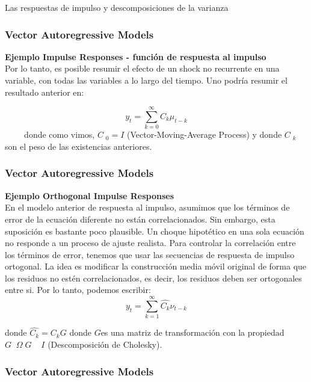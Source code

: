 \documentclass[spanish,xcolor=table]{beamer}
\begin{document}
\begin{section}{Las respuestas de impulso y descomposiciones de la varianza}
\begin{frame}
\end{frame}
\begin{frame}
\frametitle{Vector Autoregressive Models}

\textbf{Ejemplo Impulse Responses - funci\'on de respuesta al impulso}\\
Por lo tanto, es posible resumir el efecto de un shock no recurrente en una variable, con todas las variables a lo largo del tiempo. Uno podr\'{i}a resumir el resultado anterior en:

\begin{equation*}
y_t = \sum_{k=0}^{\infty}  C_k \mu_{t-k}
\end{equation*}
􏰂􏰃􏰟􏰟􏰂􏰄􏰟
donde como vimos, $C􏰝_0= I$ (Vector-Moving-Average Process) y donde $C􏰟_k$ son el peso de las existencias anteriores.

\end{frame}
\begin{frame}
\frametitle{Vector Autoregressive Models}

\textbf{Ejemplo Orthogonal Impulse Responses}\\

En el modelo anterior de respuesta al impulso, asumimos que los t\'erminos de error de la ecuaci\'on diferente no est\'an correlacionados. Sin embargo, esta suposici\'on es bastante poco plausible. Un choque hipot\'etico en una sola ecuaci\'on no responde a un proceso de ajuste realista. Para controlar la correlaci\'on entre los t\'erminos de error, tenemos que usar las secuencias de respuesta de impulso ortogonal. La idea es modificar la construcci\'on media m\'ovil original de forma que los residuos no est\'en correlacionados, es decir, los residuos deben ser ortogonales entre si. Por lo tanto, podemos escribir:
􏰣􏰟
\begin{equation*}
y_t = \sum_{k=1}^{\infty}  \hat{C_k} \nu_{t-k}
\end{equation*}

donde $\hat{C_k}=C_k G$ donde $G$es una matriz de transformaci\'on con la propiedad $G􏰄􏰁Ω􏰤G􏰥􏰄􏰁 􏰃 I$ (Descomposici\'on de Cholesky).

\end{frame}
\begin{frame}
\frametitle{Vector Autoregressive Models}


\end{frame}
\end{section}
\end{document}
